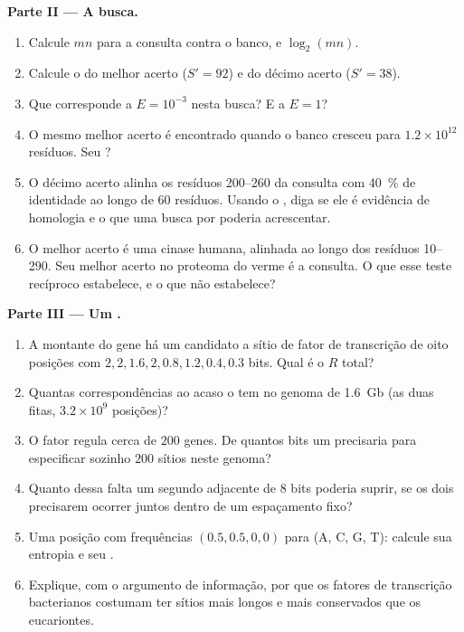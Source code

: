 \begin{problem}
\medskip
\noindent\textbf{Parte II --- A busca.}
\begin{enumerate}[resume]
  \item Calcule $mn$ para a consulta contra o banco, e $\log_{2}(mn)$.
  \item Calcule o  do melhor acerto ($S' = 92$) e do décimo
        acerto ($S' = 38$).
  \item Que  corresponde a $E = 10^{-3}$ nesta busca? E a
        $E = 1$?
  \item O mesmo melhor acerto é encontrado quando o banco cresceu para
        $1.2\times 10^{12}$ resíduos. Seu ?
  \item O décimo acerto alinha os resíduos 200--260 da consulta com
        \qty{40}{\%} de identidade ao longo de $60$ resíduos. Usando o
        , diga se ele é evidência de homologia e o que uma busca
        por  poderia acrescentar.
  \item O melhor acerto é uma cinase humana, alinhada ao longo dos
        resíduos 10--290. Seu melhor acerto no proteoma do verme é a
        consulta. O que esse teste recíproco estabelece, e o que não
        estabelece?
\end{enumerate}

\medskip
\noindent\textbf{Parte III --- Um .}
\begin{enumerate}[resume]
  \item A montante do gene há um candidato a sítio de fator de
        transcrição de oito posições com 
        $2, 2, 1.6, 2, 0.8, 1.2, 0.4, 0.3$ bits. Qual é o $R$ total?
  \item Quantas correspondências ao acaso o  tem no genoma de
        \qty{1.6}{Gb} (as duas fitas, $3.2\times 10^{9}$ posições)?
  \item O fator regula cerca de $200$ genes. De quantos bits um 
        precisaria para especificar sozinho $200$ sítios neste genoma?
  \item Quanto dessa falta um segundo  adjacente de $8$ bits
        poderia suprir, se os dois precisarem ocorrer juntos dentro de
        um espaçamento fixo?
  \item Uma posição com frequências $(0.5, 0.5, 0, 0)$ para (A, C, G,
        T): calcule sua entropia e seu .
  \item Explique, com o argumento de informação, por que os fatores de
        transcrição bacterianos costumam ter sítios mais longos e mais
        conservados que os eucariontes.
\end{enumerate}


\end{problem}

